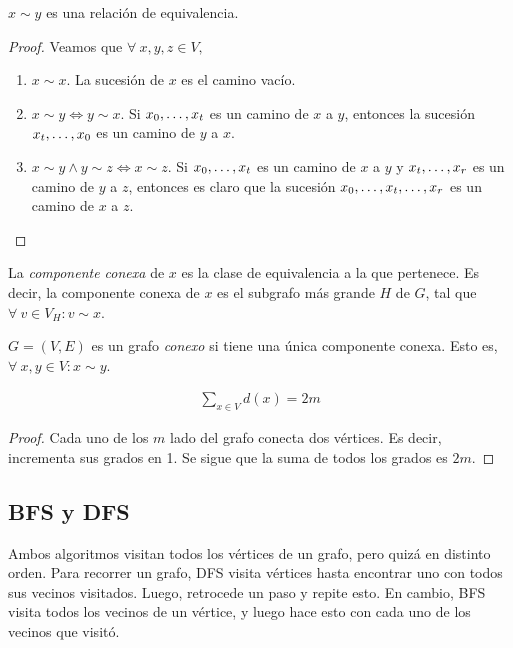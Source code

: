 \begin{proposition}
$x \sim y$ es una relación de equivalencia.
\end{proposition}
\begin{proof}
Veamos que $\forall~ x,y,z \in V,$
\begin{enumerate}
    \item $x \sim x$. La sucesión de $x$ es el camino vacío.
    
    \item $x \sim y \iff y \sim x$. Si $x_0, \mathellipsis, x_t$ es un camino de $x$ a $y$, entonces la sucesión $x_t, \mathellipsis, x_0$ es un camino de $y$ a $x$.
    \item $x \sim y \wedge y \sim z \iff x \sim z$. Si $x_0, \mathellipsis, x_t$ es un camino de $x$ a $y$ y $x_{t}, \mathellipsis, x_{r}$ es un camino de $y$ a $z$, entonces es claro que la sucesión $x_0, \mathellipsis, x_t, \mathellipsis, x_r$ es un camino de $x$ a $z$.
\end{enumerate}
\end{proof}
\begin{definition}
La \emph{componente conexa} de $x$ es la clase de equivalencia a la que pertenece. Es decir, la componente conexa de $x$ es el subgrafo más grande $H$ de $G$, tal que $\forall~v \in V_H\colon v \sim x$.

$G=(V,E)$ es un grafo \emph{conexo} si tiene una única componente conexa. Esto es, $\forall~x,y \in V\colon x \sim y$.
\end{definition}

\begin{proposition}
\begin{align}
\sum_{x\in V} d(x) = 2m \label{handshaking_lemma}
\end{align}
\end{proposition}

\begin{proof}
Cada uno de los $m$ lado del grafo conecta dos vértices. Es decir, incrementa sus grados en 1. Se sigue que la suma de todos los grados es $2m$.
\end{proof}

\subsection{BFS y DFS}
Ambos algoritmos visitan todos los vértices de un grafo, pero quizá en distinto orden. Para recorrer un grafo, DFS visita vértices hasta encontrar uno con todos sus vecinos visitados. Luego, retrocede un paso y repite esto. En cambio, BFS visita todos los vecinos de un vértice, y luego hace esto con cada uno de los vecinos que visitó.

